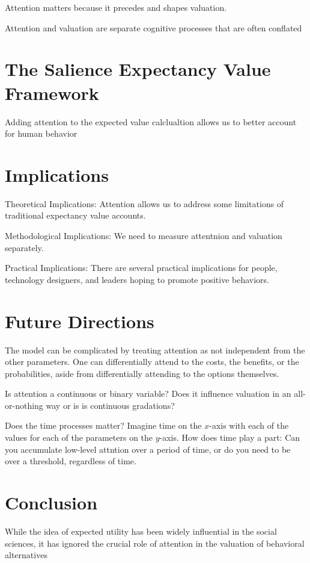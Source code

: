 \documentclass[letterpaper, 12pt]{article}
\begin{document}
Attention matters because it precedes and shapes valuation.

Attention and valuation are separate cognitive processes that are often conflated

\section{The Salience Expectancy Value Framework}

Adding attention to the expected value calclualtion allows us to better account for human behavior

\section{Implications}

Theoretical Implications: Attention allows us to address some limitations of traditional expectancy value accounts.

Methodological Implications: We need to measure attentnion and valuation separately.

Practical Implications: There are several practical implications for people, technology designers, and leaders hoping to promote positive behaviors.

\section{Future Directions}

The model can be complicated by treating attention as not independent from the other parameters. One can differentially attend to the costs, the benefits, or the probabilities, aside from differentially attending to the options themselves.


Is attention a continuous or binary variable? Does it influence valuation in an all-or-nothing way or is is continuous gradations?

Does the time processes matter? Imagine time on the $x$-axis with each of the values for each of the parameters on the $y$-axis. How does time play a part: Can you accumulate low-level attntion over a period of time, or do you need to be over a threshold, regardless of time.


\section{Conclusion}
While the idea of expected utility has been widely influential in the social sciences, it has ignored the crucial role of attention in the valuation of behavioral alternatives
    
\end{document}
